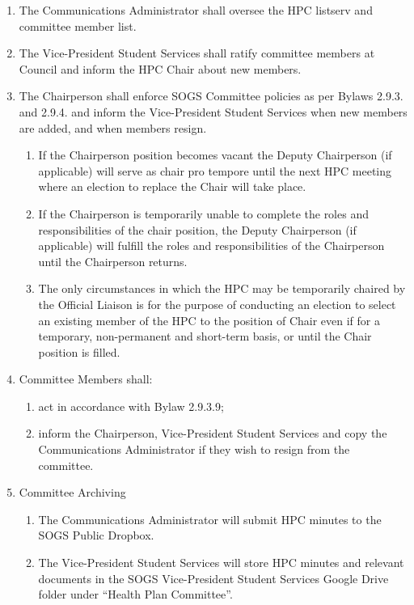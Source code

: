 \begin{enumerate} [label*=\arabic*., align=left]
\begin{enumerate} [label*=\arabic*., align=left]
\begin{enumerate}[label*=\arabic*., align=left]
\item The Communications Administrator shall oversee the HPC listserv and committee member list.
\item The Vice-President Student Services shall ratify committee members at Council and inform the HPC Chair about new members.
\item The Chairperson shall enforce SOGS Committee policies as per Bylaws 2.9.3. and 2.9.4. and inform the Vice-President Student Services when new members are added, and when members resign.
\begin{enumerate}[label*=\arabic*., align=left]
\item If the Chairperson position becomes vacant the Deputy Chairperson (if applicable) will serve as chair pro tempore until the next HPC meeting where an election to replace the Chair will take place.
\item If the Chairperson is temporarily unable to complete the roles and responsibilities of the chair position, the Deputy Chairperson (if applicable) will fulfill the roles and responsibilities of the Chairperson until the Chairperson returns.
\item The only circumstances in which the HPC may be temporarily chaired by the Official Liaison is for the purpose of conducting an election to select an existing member of the HPC to the position of Chair even if for a temporary, non-permanent and short-term basis, or until the Chair position is filled. 
\end{enumerate}
\item Committee Members shall:
\begin{enumerate}[label*=\arabic*., align=left]
\item act in accordance with Bylaw 2.9.3.9;
\item inform the Chairperson, Vice-President Student Services and copy the Communications Administrator if they wish to resign from the committee.
\end{enumerate}
\item Committee Archiving
\begin{enumerate}[label*=\arabic*., align=left]
\item The Communications Administrator will submit HPC minutes to the SOGS Public Dropbox.
\item The Vice-President Student Services will store HPC minutes and relevant documents in the SOGS Vice-President Student Services Google Drive folder under “Health Plan Committee”.

\end{enumerate}
\end{enumerate}
\end{enumerate}
\end{enumerate}
